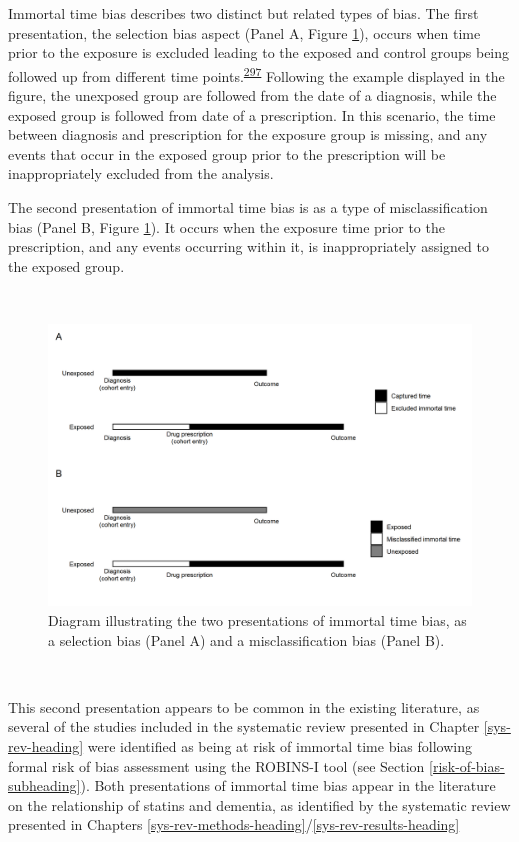 \documentclass[a4paper, twoside]{templates/ociamthesis}
\begin{document}
Immortal time bias describes two distinct but related types of bias. The first presentation, the selection bias aspect (Panel A, Figure \ref{fig:immortalTimeBias}), occurs when time prior to the exposure is excluded leading to the exposed and control groups being followed up from different time points.\textsuperscript{\protect\hyperlink{ref-levesque2010}{297}} Following the example displayed in the figure, the unexposed group are followed from the date of a diagnosis, while the exposed group is followed from date of a prescription. In this scenario, the time between diagnosis and prescription for the exposure group is missing, and any events that occur in the exposed group prior to the prescription will be inappropriately excluded from the analysis.

The second presentation of immortal time bias is as a type of misclassification bias (Panel B, Figure \ref{fig:immortalTimeBias}). It occurs when the exposure time prior to the prescription, and any events occurring within it, is inappropriately assigned to the exposed group.

~





\begin{figure}[H]
\includegraphics[width=1\linewidth]{figures/cprd-analysis/immortal_time} \caption[shortcap]{Diagram illustrating the two presentations of immortal time bias, as a selection bias (Panel A) and a misclassification bias (Panel B).}\label{fig:immortalTimeBias}
\end{figure}

~

This second presentation appears to be common in the existing literature, as several of the studies included in the systematic review presented in Chapter \ref{sys-rev-heading} were identified as being at risk of immortal time bias following formal risk of bias assessment using the ROBINS-I tool (see Section \ref{risk-of-bias-subheading}). Both presentations of immortal time bias appear in the literature on the relationship of statins and dementia, as identified by the systematic review presented in Chapters \ref{sys-rev-methods-heading}/\ref{sys-rev-results-heading}
\end{document}
